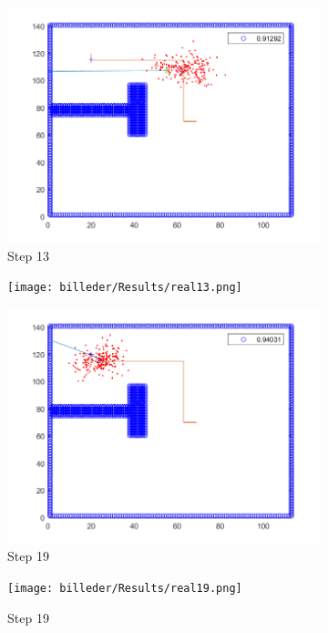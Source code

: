 \begin{figure}[H]
\centering
\begin{subfigure}{.5\textwidth}
  \centering
  \includegraphics[width=.8\linewidth]{billeder/Results/13.png}
  \caption{Step 13}
  \label{ResultDriveFig3:sub1}
\end{subfigure}%
\begin{subfigure}{.5\textwidth}
  \centering
  \texttt{[image: billeder/Results/real13.png]}
  \caption{}
  \label{ResultDriveFig3:sub2}
\end{subfigure}
\begin{subfigure}{.5\textwidth}
  \centering
  \includegraphics[width=.8\linewidth]{billeder/Results/19.png}
  \caption{Step 19}
  \label{ResultDriveFig3:sub3}
\end{subfigure}%
\begin{subfigure}{.5\textwidth}
  \centering
  \texttt{[image: billeder/Results/real19.png]}
  \caption{Step 19}
  \label{ResultDriveFig3:sub4}
\end{subfigure}
\begin{subfigure}{.5\textwidth}

\end{subfigure}
\end{figure}

